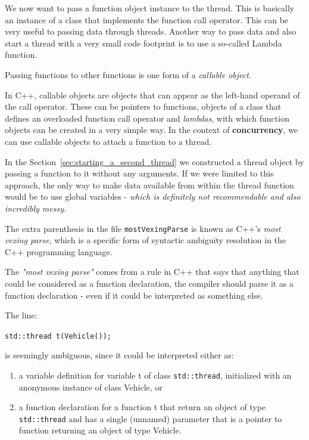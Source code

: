 \documentclass[11pt, a4paper]{article}
\begin{document}
We now want to pass a function object instance to the thread. This is basically an instance of a class that implements the function call operator. This can be very useful to passing data through threads. Another way to pass data and also start a thread with a very small code footprint is to use a so-called Lambda function. 



Passing functions to other functions is one form of a \textit{callable object}.

In C++, callable objects are objects that can appear as the left-hand operand of the call operator. These can be pointers to functions, objects of a class that defines an overloaded function call operator and \textit{lambdas}, with which function objects can be created in a very simple way. In the context of \textbf{concurrency}, we can use callable objects to attach a function to a thread. 

In the Section~\ref{sec:starting_a_second_thread} we constructed a thread object by passing a function to it without any arguments. If we were limited to this approach, the only way to make data available from within the thread function would be to use global variables - \textit{which is definitely not recommendable and also incredibly messy.}





The extra parenthesis in the file \texttt{mostVexingParse} is known as C++'s \textit{most vexing parse}, which is a specific form of syntactic ambiguity resolution in the C++ programming language.

The \textit{"most vexing parse"} comes from a rule in C++ that says that anything that could be considered as a function declaration, the compiler should parse it as a function declaration - even if it could be interpreted as something else.


The line:

\texttt{std::thread t(Vehicle());} 

is seemingly ambiguous, since it could be interpreted either as:

\begin{enumerate}
	\item a variable definition for variable t of class \texttt{std::thread}, initialized with an anonymous instance of class Vehicle, or
	\item a function declaration for a function t that return an object of type \texttt{std::thread}  and has a single (unnamed) parameter that is a pointer to function returning an object of type Vehicle.
\end{enumerate}
\end{document}
